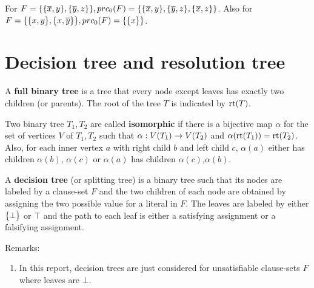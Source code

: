 \documentclass{report}
\begin{document}
\begin{examp}\label{exp:bbb}
For $F = \{\{ \overline x, y\} , \{ \overline y, z\}\}, prc_0(F) = \{\{\overline x, y\} , \{\overline y, z\} , \{\overline x, z\}\}$. Also for $F = \{ \{ x, y \} , \{ x,\overline y \} \}, prc_0(F) = \{ \{ x \} \}$.
\end{examp}
\section{Decision tree and resolution tree}
\label{sec:trees}

A \textbf{full binary tree} is a tree that every node except leaves has exactly two children (or parents). The root of the tree $T$ is indicated by $\operatorname{rt}(T)$.

\begin{defi}\label{def:isomo-trees}
Two binary tree $T_1, T_2$ are called \textbf{isomorphic} if there is a bijective map $\alpha$ for the set of vertices $V$ of $T_1, T_2$ such that $\alpha: V(T_1) \rightarrow V(T_2)$ and $\alpha(\operatorname{rt}(T_1))=\operatorname{rt}(T_2)$. Also, for each inner vertex $a$ with right child $b$ and left child $c$, $\alpha(a)$ either has children $\alpha(b)$, $\alpha(c)$ or $\alpha(a)$ has children $\alpha(c)$,$\alpha(b)$.
\end{defi}

\begin{defi}\label{def:decs-tree}
A \textbf{decision tree} (or splitting tree) is a binary tree such that its nodes are labeled by a clause-set $F$ and the two children of each node are obtained by assigning the two possible value for a literal in $F$. The leaves are labeled by either $\{ \bot \}$ or $\top$ and the path to each leaf is either a satisfying assignment or a falsifying assignment.
\end{defi}
Remarks:
  \begin{enumerate}
  \item  In this report, decision trees are just considered for unsatisfiable clause-sets $F$ where leaves are $\bot$.
  \end{enumerate}
\end{document}

